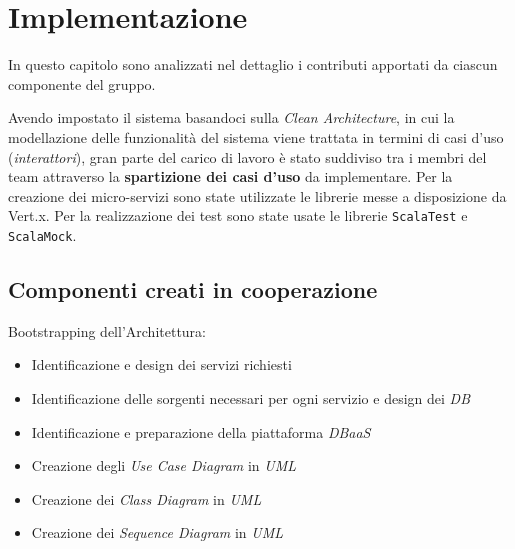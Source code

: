 \chapter{Implementazione}

In questo capitolo sono analizzati nel dettaglio i contributi apportati da ciascun componente del gruppo.

Avendo impostato il sistema basandoci sulla \textit{Clean Architecture}, in cui la modellazione delle funzionalità del sistema viene trattata in termini di casi d'uso (\textit{interattori}), gran parte del carico di lavoro è stato suddiviso tra i membri del team attraverso la  \textbf{spartizione dei casi d'uso} da implementare.
Per la creazione dei micro-servizi sono state utilizzate le librerie messe a disposizione da Vert.x. Per la realizzazione dei test sono state usate le librerie \texttt{ScalaTest} e \texttt{ScalaMock}.

\section{Componenti creati in cooperazione}

Bootstrapping dell'Architettura:

\begin{itemize}
    \item Identificazione e design dei servizi richiesti
    \item Identificazione delle sorgenti necessari per ogni servizio e design dei \textit{DB}
    \item Identificazione e preparazione della piattaforma \textit{DBaaS} 
    \item Creazione degli \textit{Use Case Diagram} in \textit{UML}
    \item Creazione dei \textit{Class Diagram} in \textit{UML}
    \item Creazione dei \textit{Sequence Diagram} in \textit{UML}
\end{itemize}

